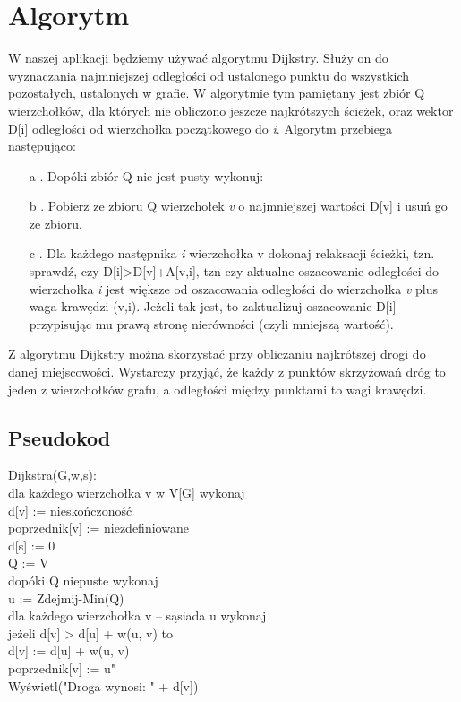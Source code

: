 \documentclass[11pt,a4paper]{mwart}
\begin{document}
\section{Algorytm}
W naszej aplikacji będziemy używać algorytmu Dijkstry. Służy on do wyznaczania najmniejszej odległości od ustalonego punktu do wszystkich pozostałych, ustalonych w grafie. W algorytmie tym pamiętany jest zbiór Q wierzchołków, dla których nie obliczono jeszcze najkrótszych ścieżek, oraz wektor D[i] odległości od wierzchołka początkowego do \textit{i}. Algorytm przebiega następująco:
\begin{flushleft}
\begin{enumerate}
\item[a]. Dopóki zbiór Q nie jest pusty wykonuj:
\item[b]. Pobierz ze zbioru Q wierzchołek \textit{v} o najmniejszej wartości D[v] i usuń go ze zbioru.
\item[c]. Dla każdego następnika \textit{i} wierzchołka v dokonaj relaksacji ścieżki, tzn. sprawdź, czy D[i]>D[v]+A[v,i], tzn czy aktualne oszacowanie odległości do wierzchołka \textit{i} jest większe od oszacowania odległości do wierzchołka \textit{v} plus waga krawędzi (v,i).
Jeżeli tak jest, to zaktualizuj oszacowanie D[i] przypisując mu prawą stronę nierówności (czyli mniejszą wartość).\\
\end{enumerate}
\end{flushleft}
Z algorytmu Dijkstry można skorzystać przy obliczaniu najkrótszej drogi do danej miejscowości. Wystarczy przyjąć, że każdy z punktów skrzyżowań dróg to jeden z wierzchołków grafu, a odległości między punktami to wagi krawędzi.
\subsection{Pseudokod}
\begin{flushleft}
Dijkstra(G,w,s):\\
dla każdego wierzchołka v w V[G] wykonaj\\
d[v] := nieskończoność\\
poprzednik[v] := niezdefiniowane\\
d[s] := 0\\
Q := V\\
dopóki Q niepuste wykonaj\\
u := Zdejmij-Min(Q)\\
dla każdego wierzchołka v – sąsiada u wykonaj\\
jeżeli d[v] > d[u] + w(u, v) to\\
d[v] := d[u] + w(u, v)\\
poprzednik[v] := u"\\
Wyświetl("Droga wynosi: " + d[v])\\
\end{flushleft}
\end{document}
